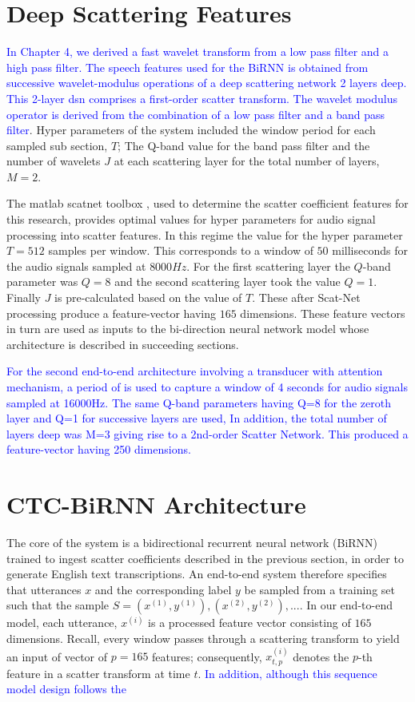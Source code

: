 \section{Deep Scattering Features}\label{sec_c7_wparams}
\textcolor{blue}{In Chapter 4, we derived a fast wavelet transform from a low pass filter and a high pass filter.  The speech features used for the BiRNN is obtained from successive wavelet-modulus operations of a deep scattering network 2 layers deep.  This 2-layer \acrshort{dsn} comprises a first-order scatter transform. The wavelet modulus operator is derived from the combination of a low pass filter and a band pass filter}.  Hyper parameters of the system included the window period for each sampled sub section, $T$;  The Q-band value for the band pass filter and the number of wavelets $J$ at each scattering layer for the total number of layers, $M=2$.

The matlab scatnet toolbox \citep{anden2014scatnet}, used to determine the scatter coefficient features for this research, provides optimal values for hyper parameters for audio signal processing into scatter features.  In this regime the value for the hyper parameter $T=512$ samples per window. This corresponds to a window of $50$ milliseconds for the audio signals sampled at $8000 Hz$.  For the first scattering layer the $Q$-band parameter was $Q=8$ and the second scattering layer took the value  $Q=1$.  Finally $J$ is pre-calculated based on the value of $T$.  These after Scat-Net processing produce a feature-vector having $165$ dimensions.  These feature vectors in turn are used as inputs to the bi-direction neural network model whose architecture is described in succeeding sections.

\textcolor{blue}{For the second end-to-end architecture involving a transducer with attention mechanism, a period of  is used to capture a window of 4 seconds for audio signals sampled at 16000Hz. The same Q-band parameters having Q=8 for the zeroth layer and Q=1 for successive layers are used, In addition, the total number of layers deep was M=3 giving rise to a 2nd-order Scatter Network. This produced a feature-vector having 250 dimensions.}

\section{CTC-BiRNN Architecture}
The core of the system is a bidirectional recurrent neural network (BiRNN) trained to ingest scatter coefficients described in the previous section, in order to generate English text transcriptions.  An end-to-end system therefore specifies that utterances $x$ and the corresponding label $y$ be sampled from a training set such that the sample $S = {(x^{(1)}, y^{(1)}), (x^{(2)}, y^{(2)}), . . .}$.   In our end-to-end model, each utterance, $x^{(i)}$ is a processed feature vector consisting of $165$ dimensions.  Recall, every window passes through a scattering transform to yield an input of vector of $p=165$ features; consequently,   $x^{(i)}_{t,p}$ denotes the $p$-th feature in a scatter transform at time $t$.  \textcolor{blue}{In addition, although this sequence model design follows the }


